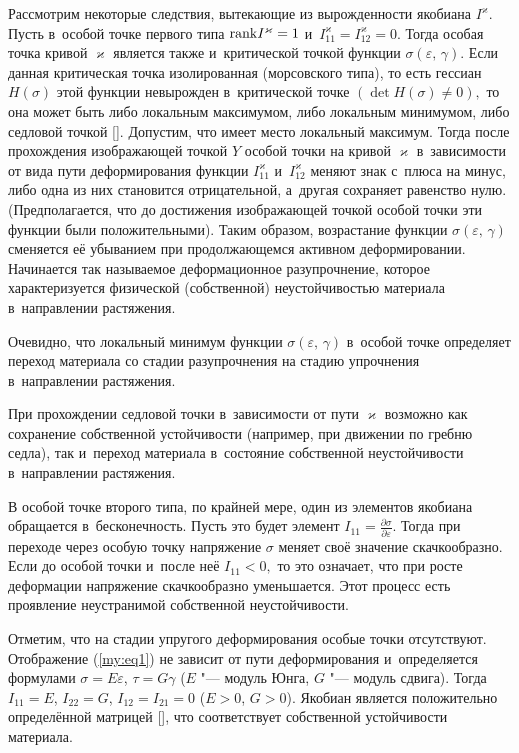 Рассмотрим некоторые следствия, вытекающие из вырожденности якобиана $I^\varkappa.$ Пусть в~особой точке первого типа ${\rm rank} I^{\varkappa}=1$ и~$I^\varkappa_{11}=I^\varkappa_{12}=0.$ Тогда особая точка кривой $\varkappa$ является также и~критической точкой функции $\sigma(\varepsilon,\, \gamma).$ Если данная критическая точка изолированная (морсовского типа), то есть гессиан $H(\sigma)$ этой функции невырожден в~критической точке $(\det H(\sigma)\neq0),$ то она может быть либо локальным максимумом, либо локальным минимумом, либо седловой точкой []. Допустим, что имеет место локальный максимум. Тогда после прохождения изображающей точкой $Y$ особой точки на кривой $\varkappa$ в~зависимости от вида пути деформирования функции $I^\varkappa_{11}$ и~$I^\varkappa_{12}$ меняют знак с~плюса на минус, либо одна из них становится отрицательной, а~другая сохраняет равенство нулю. (Предполагается, что до достижения изображающей точкой особой точки эти функции были положительными). Таким образом, возрастание функции $\sigma(\varepsilon,\, \gamma)$ сменяется её убыванием при продолжающемся активном деформировании. Начинается так называемое деформационное разупрочнение, которое характеризуется физической (собственной) неустойчивостью материала в~направлении растяжения.



Очевидно, что локальный минимум функции $\sigma(\varepsilon,\, \gamma)$ в~особой точке определяет переход материала со стадии разупрочнения на стадию упрочнения в~направлении растяжения.



При прохождении седловой точки в~зависимости от пути $\varkappa$ возможно как сохранение собственной устойчивости (например, при движении по гребню седла), так и~переход материала в~состояние собственной неустойчивости в~направлении растяжения.



В особой точке второго типа, по крайней мере, один из элементов якобиана обращается в~бесконечность. Пусть это будет элемент $I_{11}=\frac{\partial \sigma}{\partial \varepsilon}.$ Тогда при переходе через особую точку напряжение $\sigma$ меняет своё значение скачкообразно. Если до особой точки и~после неё $I_{11}<0,$ то это означает, что при росте деформации напряжение скачкообразно уменьшается. Этот процесс есть проявление неустранимой собственной неустойчивости.



Отметим, что на стадии упругого деформирования особые точки отсутствуют. Отображение (\ref{my:eq1}) не зависит от пути деформирования и~определяется формулами $\sigma=E\varepsilon$, $\tau=G\gamma$ ($E$ "--- модуль Юнга, $G$ "--- модуль сдвига). Тогда $I_{11}=E$, $I_{22}=G$, $I_{12}=I_{21}=0$ ($E>0$, $G>0$). Якобиан является положительно определённой матрицей [], что соответствует собственной устойчивости материала.



